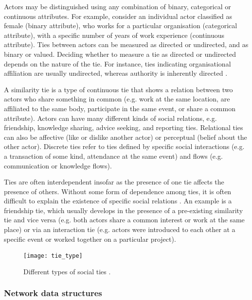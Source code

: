 Actors may be distinguished using any combination of binary, categorical or continuous attributes. For example, consider an individual actor classified as female (binary attribute), who works for a particular organisation (categorical attribute), with a specific number of years of work experience (continuous attribute). Ties between actors can be measured as directed or undirected, and as binary or valued. Deciding whether to measure a tie as directed or undirected depends on the nature of the tie. For instance, ties indicating organisational affiliation are usually undirected, whereas authority is inherently directed \citep{borgatti2013analyzing}. \medskip
 
 A similarity tie is a type of continuous tie that shows a relation between two actors who share something in common (e.g. work at the same location, are affiliated to the same body, participate in the same event, or share a common attribute). Actors can have many different kinds of social relations, e.g. friendship, knowledge sharing, advice seeking, and reporting ties. Relational ties can also be affective (like or dislike another actor) or perceptual (belief about the other actor). Discrete ties refer to ties defined by specific social interactions (e.g. a transaction of some kind, attendance at the same event) and flows (e.g. communication or knowledge flows). \medskip

Ties are often interdependent insofar as the presence of one tie affects the presence of others. Without some form of dependence among ties, it is often difficult to explain the existence of specific social relations \citep{lusher2013exponential}. An example is a friendship tie, which usually develops in the presence of a pre-existing similarity tie and vice versa (e.g. both actors share a common interest or work at the same place) or via an interaction tie (e.g. actors were introduced to each other at a specific event or worked together on a particular project). \medskip

\begin{figure}
    \centering
    \texttt{[image: tie\_type]}
    \caption[Different types of social ties]{Different types of social ties \citep{borgatti2013analyzing}.}
    \label{fig:tie_type}
\end{figure}

\subsubsection{Network data structures}

